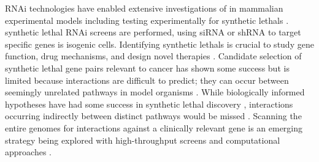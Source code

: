 \acrfull{RNAi} technologies have enabled extensive investigations of  in mammalian experimental models including testing experimentally for \glspl{synthetic lethal} \citep{Fraser2004}. \Gls{synthetic lethal} \gls{RNAi} screens are performed, using \acrfull{siRNA} or \gls{shRNA} to target specific genes is isogenic cells. Identifying \glspl{synthetic lethal} is crucial to study gene function, drug mechanisms, and design novel therapies \citep{Lum2004}. Candidate selection of \gls{synthetic lethal} gene pairs relevant to cancer has shown some success but is limited because interactions are difficult to predict; they can occur between seemingly unrelated \glspl{pathway} in model organisms \citep{Costanzo2011}. While biologically informed hypotheses have had some success in \gls{synthetic lethal} discovery \citep{Bitler2015, Bryant2005, Farmer2005}, interactions occurring indirectly between distinct \glspl{pathway} would be missed \citep{Boone2007, Costanzo2011}. Scanning the entire \glspl{genome} for interactions against a clinically relevant gene is an emerging strategy being explored with \glspl{high-throughput screen} \citep{Fece2015} and computational approaches \citep{Boucher2013, vanSteen2011}.  

